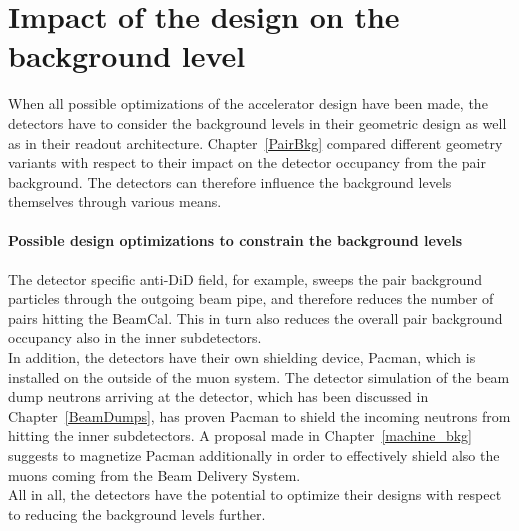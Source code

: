 \section{Impact of the \sid design on the background level}

When all possible optimizations of the accelerator design have been made, the detectors have to consider the background levels in their geometric design as well as in their readout architecture.
Chapter~\ref{PairBkg} compared different \sid geometry variants with respect to their impact on the detector occupancy from the pair background.
The detectors can therefore influence the background levels themselves through various means.

\paragraph{Possible \sid design optimizations to constrain the background levels}

The detector specific anti-DiD field, for example, sweeps the pair background particles through the outgoing beam pipe, and therefore reduces the number of pairs hitting the \sid BeamCal.
This in turn also reduces the overall pair background occupancy also in the inner subdetectors.
\\In addition, the detectors have their own shielding device, Pacman, which is installed on the outside of the muon system.
The detector simulation of the beam dump neutrons arriving at the \sid detector, which has been discussed in Chapter~\ref{BeamDumps}, has proven Pacman to shield the incoming neutrons from hitting the inner subdetectors.
A proposal made in Chapter~\ref{machine_bkg} suggests to magnetize Pacman additionally in order to effectively shield also the muons coming from the Beam Delivery System.
\\All in all, the detectors have the potential to optimize their designs with respect to reducing the background levels further.